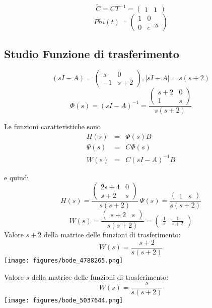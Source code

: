 \documentclass{article}
\begin{document}
\[ \widetilde{C} = C T^{-1} = \left(\begin{matrix}1 & 1\end{matrix}\right) \]
\[Phi(t) = \left(\begin{matrix}1 & 0\\0 & e^{- 2 t}\end{matrix}\right) \]

\subsection{Studio Funzione di trasferimento}

\[ (sI-A) = \left(\begin{matrix}s & 0\\-1 & s + 2\end{matrix}\right), |sI-A| = s \left(s + 2\right) \]
\[ \Phi(s) = (sI-A)^{-1} = \frac{\left(\begin{matrix}s + 2 & 0\\1 & s\end{matrix}\right)}{s \left(s + 2\right)} \]

Le funzioni caratteristiche sono \[\begin{array}{rcl}  H(s) & = & \Phi(s)B \\ \Psi(s) & = & C \Phi(s)\\ W(s) & = & C(sI-A)^{-1}B  \end{array} \]

e quindi \[ H(s)  =  \frac{\left(\begin{matrix}2 s + 4 & 0\\s + 2 & s\end{matrix}\right)}{s \left(s + 2\right)} \ \Psi(s) = \frac{\left(\begin{matrix}1 & s\end{matrix}\right)}{s \left(s + 2\right)} \]
\[ W(s)  =  \frac{\left(\begin{matrix}s + 2 & s\end{matrix}\right)}{s \left(s + 2\right)} = \left(\begin{matrix}\frac{1}{s} & \frac{1}{s + 2}\end{matrix}\right)  \] 
Valore $ s + 2 $ della matrice delle funzioni di trasferimento:
\[ W(s) = \frac{s + 2}{s \left(s + 2\right)} \]\texttt{[image: figures/bode\_4788265.png]}


Valore $ s $ della matrice delle funzioni di trasferimento:
\[ W(s) = \frac{s}{s \left(s + 2\right)} \]\texttt{[image: figures/bode\_5037644.png]}
\end{document}
